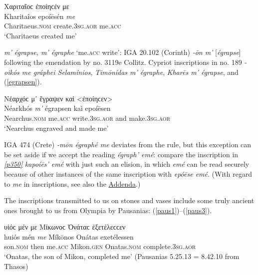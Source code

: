 \begin{exe}
\ex Χαριταῖοϲ ἐποίηϲέν με\\
\gll Kharitaîos epoíēsén \emph{me}\\
Charitaeus.\textsc{nom} create.\textsc{3sg.aor} me.\textsc{acc}\\
\trans `Charitaeus created me' \citep[51]{Klein1887}
\label{rulebreaker}
\end{exe}

\emph{m' égrapse, m' égraphe} `me.\textsc{acc} write': IGA 20.102 (Corinth) \textit{-ōn \emph{m'}} {[}\textit{égrapse}{]} following the emendation by \citet[65]{Blass1888} no. 3119e Collitz. Cypriot inscriptions in \citet[90]{Hoffmann1891} no. 189 \textit{-oikós \emph{me} gráphei Selamínios}, \citet[29]{Klein1887} \textit{Timōnídas \emph{m'} égraphe}, \citet[30]{Klein1887} \textit{Kharēs \emph{m'} égrapse},
and (\ref{egrapsen}). 

\begin{exe}
\ex Νέαρχόϲ μ᾽ ἔγραψεν καὶ {<}ἐποίηϲεν{>}\\
\gll Néarkhós \emph{m'} égrapsen kaì epoíēsen\\
Nearchus.\textsc{nom} me.\textsc{acc} write.\textsc{3sg.aor} and make.\textsc{3sg.aor}\\
\trans `Nearchus engraved and made me' \citep[38]{Klein1887}
\label{egrapsen}
\end{exe}

IGA 474 (Crete) \textit{-mōn égraphé \emph{me}}\label{IGA474} deviates from the rule, but this exception can be set aside if we accept the reading \textit{égraph' emé}: compare the inscription in \citet[40]{Klein1887} \hyperlink{p350}{\emph{[p350]}} \textit{kapoíēs' emé} with just such an elision, in which \textit{emé} can be read securely because of other instances of the same inscription with \textit{epóēse emé}. (With regard to \textit{me} in inscriptions, see also the \hyperlink{addenda}{Addenda}.)

The inscriptions transmitted to us on stones and vases include some truly ancient ones brought to us from Olympia by Pausanias: (\ref{paus1})--(\ref{paus3}).

\begin{exe}
\ex υἱόϲ μέν με Μίκωνοϲ Ὀνάταϲ ἐξετέλεϲϲεν\\
\gll huiós mén \emph{me} Míkōnos Onátas exetélessen\\
son.\textsc{nom} then me.\textsc{acc} Mikon.\textsc{gen} Onatas.\textsc{nom} complete.\textsc{3sg.aor}\\
\trans `Onatas, the son of Mikon, completed me' (Pausanias 5.25.13 = 8.42.10 from Thasos)
\label{paus1}
\end{exe}

